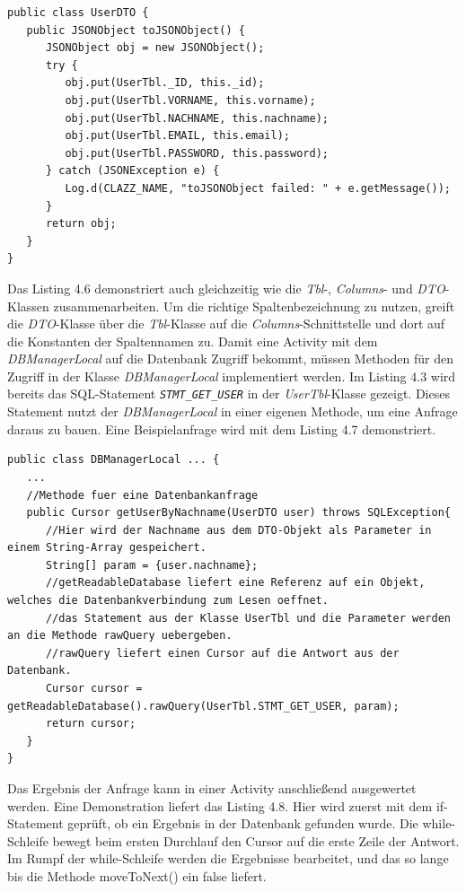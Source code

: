 \begin{lstlisting}[caption={\emph{UserDTO}-Klasse in leicht reduzierter Form}]
public class UserDTO {
   public JSONObject toJSONObject() {
      JSONObject obj = new JSONObject();
      try {
         obj.put(UserTbl._ID, this._id);
         obj.put(UserTbl.VORNAME, this.vorname);
         obj.put(UserTbl.NACHNAME, this.nachname);
         obj.put(UserTbl.EMAIL, this.email);
         obj.put(UserTbl.PASSWORD, this.password);
      } catch (JSONException e) {
         Log.d(CLAZZ_NAME, "toJSONObject failed: " + e.getMessage());
      }
      return obj;
   }
}
\end{lstlisting}
Das Listing 4.6 demonstriert auch gleichzeitig wie die \emph{Tbl}-, \emph{Columns}- und \emph{DTO}-Klassen zusammenarbeiten.
Um die richtige Spaltenbezeichnung zu nutzen, greift die \emph{DTO}-Klasse \"uber die \emph{Tbl}-Klasse auf die \emph{Columns}-Schnittstelle 
und dort auf die Konstanten der Spaltennamen zu.
Damit eine Activity mit dem \emph{DBManagerLocal} auf die Datenbank Zugriff bekommt, 
m\"ussen Methoden f\"ur den Zugriff in der Klasse \emph{DBManagerLocal} implementiert werden.
Im Listing 4.3 wird bereits das SQL-Statement \emph{\texttt{STMT\_GET\_USER}} in der \emph{UserTbl}-Klasse gezeigt.
Dieses Statement nutzt der \emph{DBManagerLocal} in einer eigenen Methode, um eine Anfrage daraus zu bauen.
Eine Beispielanfrage wird mit dem Listing 4.7 demonstriert.\\

\begin{lstlisting}[caption={Methode \emph{getUserByNachname()} der \emph{DBManagerLocal}-Klasse}]
public class DBManagerLocal ... {
   ...
   //Methode fuer eine Datenbankanfrage
   public Cursor getUserByNachname(UserDTO user) throws SQLException{
      //Hier wird der Nachname aus dem DTO-Objekt als Parameter in einem String-Array gespeichert.
      String[] param = {user.nachname};
      //getReadableDatabase liefert eine Referenz auf ein Objekt, welches die Datenbankverbindung zum Lesen oeffnet.
      //das Statement aus der Klasse UserTbl und die Parameter werden an die Methode rawQuery uebergeben.
      //rawQuery liefert einen Cursor auf die Antwort aus der Datenbank.
      Cursor cursor = getReadableDatabase().rawQuery(UserTbl.STMT_GET_USER, param);
      return cursor;
   }   
}
\end{lstlisting}

Das Ergebnis der Anfrage kann in einer Activity anschlie\ss{}end ausgewertet werden.
Eine Demonstration liefert das Listing 4.8.
Hier wird zuerst mit dem if-Statement gepr\"uft, ob ein Ergebnis in der Datenbank gefunden wurde.
Die while-Schleife bewegt beim ersten Durchlauf den Cursor auf die erste Zeile der Antwort.
Im Rumpf der while-Schleife werden die Ergebnisse bearbeitet, und das so lange bis die Methode moveToNext() ein false liefert.\\


